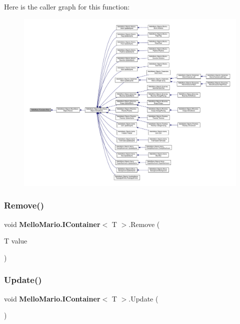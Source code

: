 Here is the caller graph for this function\+:
\nopagebreak
\begin{figure}[H]
\begin{center}
\leavevmode
\includegraphics[width=350pt]{interfaceMelloMario_1_1IContainer_a515faf6ba73cf569cb85fa5f690e2941_icgraph}
\end{center}
\end{figure}
\mbox{\label{interfaceMelloMario_1_1IContainer_a44bdfbd6bdc5cb295df9837b5dc1c991}} 
\subsubsection{Remove()}
{\footnotesize\ttfamily void \textbf{ Mello\+Mario.\+I\+Container}$<$ T $>$.Remove (\begin{DoxyParamCaption}\item[{T}]{value }\end{DoxyParamCaption})}

\mbox{\label{interfaceMelloMario_1_1IContainer_a4d27256b126b8a3b596b06cf2def34c7}} 
\subsubsection{Update()}
{\footnotesize\ttfamily void \textbf{ Mello\+Mario.\+I\+Container}$<$ T $>$.Update (\begin{DoxyParamCaption}{ }\end{DoxyParamCaption})}



